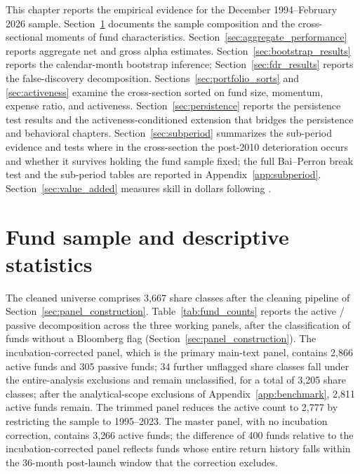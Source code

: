 \documentclass[12pt, oneside]{report}
\begin{document}
\noindent This chapter reports the empirical evidence for the December
1994--February 2026 sample. Section~\ref{sec:descriptive} documents the
sample composition and the cross-sectional moments of fund
characteristics. Section~\ref{sec:aggregate_performance} reports
aggregate net and gross alpha estimates. Section~\ref{sec:bootstrap_results}
reports the \textcite{FamaFrench2010} calendar-month bootstrap inference;
Section~\ref{sec:fdr_results} reports the
\textcite{BarrasScailletWermers2010} false-discovery decomposition.
Sections~\ref{sec:portfolio_sorts} and \ref{sec:activeness} examine the
cross-section sorted on fund size, momentum, expense ratio, and
activeness. Section~\ref{sec:persistence} reports the persistence test
results and the activeness-conditioned extension that bridges the
persistence and behavioral chapters. Section~\ref{sec:subperiod}
summarizes the sub-period evidence and tests where in the cross-section
the post-2010 deterioration occurs and whether it survives holding the
fund sample fixed; the full Bai--Perron break test and the sub-period
tables are reported in Appendix~\ref{app:subperiod}.
Section~\ref{sec:value_added} measures skill in dollars following
\textcite{BerkVanBinsbergen2015}.

\section{Fund sample and descriptive statistics}
\label{sec:descriptive}

\noindent The cleaned universe comprises 3{,}667 share classes after the
cleaning pipeline of Section~\ref{sec:panel_construction}.
Table~\ref{tab:fund_counts} reports the active / passive
decomposition across the three working panels, after the classification
of funds without a Bloomberg flag (Section~\ref{sec:panel_construction}).
The incubation-corrected panel, which is the primary main-text panel,
contains 2{,}866 active funds and 305 passive funds; 34 further unflagged
share classes fall under the entire-analysis exclusions and remain
unclassified, for a total of 3{,}205 share classes; after the analytical-scope exclusions of
Appendix~\ref{app:benchmark}, 2{,}811 active funds remain. The trimmed
panel reduces the active count to 2{,}777 by restricting the sample to
1995--2023. The master panel, with no incubation correction, contains
3{,}266 active funds; the difference of 400 funds relative to the
incubation-corrected panel reflects funds whose entire return history
falls within the 36-month post-launch window that the
\textcite{Evans2010} correction excludes.
\end{document}
